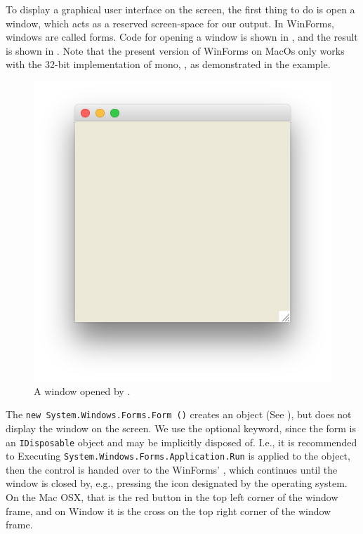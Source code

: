 \documentclass[fsharpNotes.tex]{subfiles}
\begin{document}
To display a graphical user interface on the screen, the first thing to do is open a window, which acts as a reserved screen-space for our output. In WinForms, windows are called forms. Code for opening a window is shown in , and the result is shown in . Note that the present version of WinForms on MacOs only works with the 32-bit implementation of mono, , as demonstrated in the example.
%
%
%
%
\begin{figure}
  \centering
  \includegraphics[scale=0.2]{openWindow}
  \caption{A window opened by .}
  \label{fig:openWindow}
\end{figure}
The \lstinline!new System.Windows.Forms.Form ()! creates an object (See ), but does not display the window on the screen. We use the optional  keyword, since the form is an \lstinline{IDisposable} object and may be implicitly disposed of. I.e., it is recommended to  Executing \lstinline!System.Windows.Forms.Application.Run! is applied to the object, then the control is handed over to the WinForms' , which continues until the window is closed by, e.g., pressing the icon designated by the operating system. On the Mac OSX, that is the red button in the top left corner of the window frame, and on Window it is the cross on the top right corner of the window frame.
\end{document}
